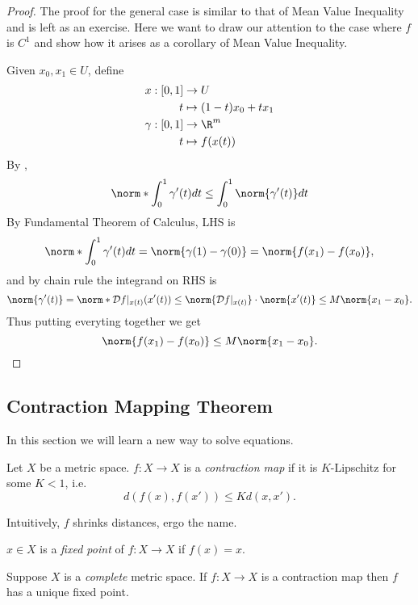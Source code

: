 \documentclass[a4paper]{article}
\newcommand*{\D}{\mathcal{D}}
\theoremstyle{definition}
\begin{document}
\begin{proof}
  The proof for the general case is similar to that of Mean Value Inequality and is left as an exercise. Here we want to draw our attention to the case where \(f\) is \(C^1\) and show how it arises as a corollary of Mean Value Inequality.

  Given \(x_0, x_1 \in U\), define
  \begin{align*}
    x: [0, 1] &\to U \\
    t &\mapsto (1 - t)x_0 + t x_1 \\
    \gamma: [0, 1] &\to \R^m \\
    t &\mapsto f(x(t))
  \end{align*}
  By ,
  \[
    \norm*{\int_{0}^{1} \gamma'(t) dt} \leq \int_{0}^{1} \norm{\gamma'(t)} dt
  \]
  By Fundamental Theorem of Calculus, LHS is
  \[
    \norm*{\int_{0}^{1} \gamma'(t) dt} = \norm{\gamma(1) - \gamma(0)} = \norm{f(x_1) - f(x_0)},
  \]
  and by chain rule the integrand on RHS is
  \[
    \norm{\gamma'(t)} = \norm*{ \D f|_{x(t)}(x'(t))} \leq \norm{\D f|_{x(t)}} \cdot \norm{x'(t)} \leq M \norm{x_1 - x_0}.
  \]
  Thus putting everyting together we get
  \[
    \norm{f(x_1) - f(x_0)} \leq M \norm{x_1 - x_0}.
  \]
\end{proof}

\subsection{Contraction Mapping Theorem}

In this section we will learn a new way to solve equations.

\begin{definition}
  Let \(X\) be a metric space. \(f: X \to X\) is a \emph{contraction map} if it is \(K\)-Lipschitz for some \(K < 1\), i.e.
  \[
    d(f(x), f(x')) \leq K d(x, x').
  \]
\end{definition}

Intuitively, \(f\) shrinks distances, ergo the name.

\begin{definition}
  \(x \in X\) is a \emph{fixed point} of \(f: X \to X\) if \(f(x) = x\).
\end{definition}

\begin{theorem}
  \label{thm:contraction}
  Suppose \(X\) is a \emph{complete} metric space. If \(f: X \to X\) is a contraction map then \(f\) has a unique fixed point.
\end{theorem}
\end{document}
